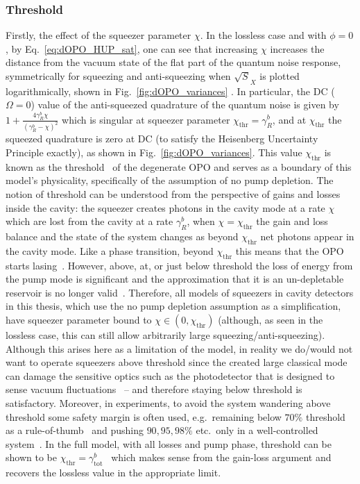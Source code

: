 \subsubsection{Threshold}
Firstly, the effect of the squeezer parameter $\chi$. In the lossless case and with $\phi=0$, by Eq.~\ref{eq:dOPO_HUP_sat}, one can see that increasing $\chi$ increases the distance from the vacuum state of the flat part of the quantum noise response, symmetrically for squeezing and anti-squeezing when $\sqrt S_X$ is plotted logarithmically, shown in Fig.~\ref{fig:dOPO_variances} . In particular, the DC ($\Omega=0$) value of the anti-squeezed quadrature of the quantum noise is given by $1+\frac{4 \gamma^b_R \chi}{\left(\gamma^b_R-\chi\right)^2}$ which is singular at squeezer parameter $\chi_\text{thr}=\gamma^b_R$, and at $\chi_\text{thr}$ the squeezed quadrature is zero at DC (to satisfy the Heisenberg Uncertainty Principle exactly), as shown in Fig.~\ref{fig:dOPO_variances}. This value $\chi_\text{thr}$ is known as the threshold~\cite{} of the degenerate OPO and serves as a boundary of this model's physicality, specifically of the assumption of no pump depletion. The notion of threshold can be understood from the perspective of gains and losses inside the cavity: the squeezer creates photons in the cavity mode at a rate $\chi$ which are lost from the cavity at a rate $\gamma^b_R$, when $\chi=\chi_\text{thr}$ the gain and loss balance and the state of the system changes as beyond $\chi_\text{thr}$ net photons appear in the cavity mode. Like a phase transition, beyond $\chi_\text{thr}$ this means that the OPO starts lasing~\cite{}. However, above, at, or just below threshold the loss of energy from the pump mode is significant and the approximation that it is an un-depletable reservoir is no longer valid~\cite{}. Therefore, all models of squeezers in cavity detectors in this thesis, which use the no pump depletion assumption as a simplification, have squeezer parameter bound to $\chi\in(0,\chi_\text{thr})$ (although, as seen in the lossless case, this can still allow arbitrarily large squeezing/anti-squeezing). Although this arises here as a limitation of the model, in reality we do/would not want to operate squeezers above threshold since the created large classical mode can damage the sensitive optics such as the photodetector that is designed to sense vacuum fluctuations~\cite{} -- and therefore staying below threshold is satisfactory. Moreover, in experiments, to avoid the system wandering above threshold some safety margin is often used, e.g.\ remaining below $70\%$ threshold as a rule-of-thumb~\cite{} and pushing $90,95,98\%$ etc.\ only in a well-controlled system~\cite{}. In the full model, with all losses and pump phase, threshold can be shown to be $\chi_\text{thr}=\gamma^b_\text{tot}$~\cite{} which makes sense from the gain-loss argument and recovers the lossless value in the appropriate limit. %

